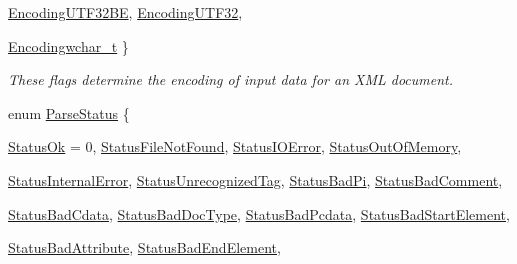 \begin{DoxyCompactItemize}
\hyperlink{namespacephys_1_1xml_a420f5de782438f88160321385bea2015a5fb13deaf1552b0f4c00e2b8cafce0b9}{EncodingUTF32BE}, 
\hyperlink{namespacephys_1_1xml_a420f5de782438f88160321385bea2015ac61c2f632bd66c2466c29783beb33f8a}{EncodingUTF32}, 
\par
\hyperlink{namespacephys_1_1xml_a420f5de782438f88160321385bea2015a2bc9c8d42796901c8feaa25e17c56cef}{Encodingwchar\_\-t}
 \}
\begin{DoxyCompactList}\small\item\em These flags determine the encoding of input data for an XML document. \item\end{DoxyCompactList}\item 
enum \hyperlink{namespacephys_1_1xml_ae7aabb879b21c73d8183a54470f8917f}{ParseStatus} \{ \par
\hyperlink{namespacephys_1_1xml_ae7aabb879b21c73d8183a54470f8917fa9ea9b3eecb4bb9f01745c94150982560}{StatusOk} =  0, 
\hyperlink{namespacephys_1_1xml_ae7aabb879b21c73d8183a54470f8917fa6f0279c8ce0103b77edcf3ce91fa64b4}{StatusFileNotFound}, 
\hyperlink{namespacephys_1_1xml_ae7aabb879b21c73d8183a54470f8917fa63f6d040311f50c1234a8eb873a0a95c}{StatusIOError}, 
\hyperlink{namespacephys_1_1xml_ae7aabb879b21c73d8183a54470f8917fac2a8163c9a8e285153d2a96b011bd49f}{StatusOutOfMemory}, 
\par
\hyperlink{namespacephys_1_1xml_ae7aabb879b21c73d8183a54470f8917fa458daab0a01f8dd3d0d85b4e41b9e187}{StatusInternalError}, 
\hyperlink{namespacephys_1_1xml_ae7aabb879b21c73d8183a54470f8917fabe0f4590debfa56c7e3a4c8da261b106}{StatusUnrecognizedTag}, 
\hyperlink{namespacephys_1_1xml_ae7aabb879b21c73d8183a54470f8917fa55afc9de133574f5c9376493c8e6fe09}{StatusBadPi}, 
\hyperlink{namespacephys_1_1xml_ae7aabb879b21c73d8183a54470f8917fa8f3864efd7b684ae57a8a7886a23f19a}{StatusBadComment}, 
\par
\hyperlink{namespacephys_1_1xml_ae7aabb879b21c73d8183a54470f8917fa18f36b8d712a6bbc716f90af8659df22}{StatusBadCdata}, 
\hyperlink{namespacephys_1_1xml_ae7aabb879b21c73d8183a54470f8917fa8fb41bcdb73615156e9a031fa4c5db4f}{StatusBadDocType}, 
\hyperlink{namespacephys_1_1xml_ae7aabb879b21c73d8183a54470f8917fab30b3a432145b0e9c6595e75da773628}{StatusBadPcdata}, 
\hyperlink{namespacephys_1_1xml_ae7aabb879b21c73d8183a54470f8917fadbc5b334b4215ce2332073de46c58155}{StatusBadStartElement}, 
\par
\hyperlink{namespacephys_1_1xml_ae7aabb879b21c73d8183a54470f8917fac5fdddc5cc4d127aa5c53efb85846ccf}{StatusBadAttribute}, 
\hyperlink{namespacephys_1_1xml_ae7aabb879b21c73d8183a54470f8917fa72532447020c081f343c4a719add7450}{StatusBadEndElement}, 

\end{DoxyCompactItemize}
